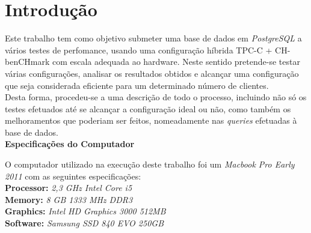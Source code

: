 \section{Introdução}

Este trabalho tem como objetivo submeter uma base de dados em \textit{PostgreSQL} a vários testes de perfomance, usando uma configuração híbrida TPC-C + CH-benCHmark com escala adequada ao hardware. Neste sentido pretende-se testar várias configurações, analisar os resultados obtidos e alcançar uma configuração que seja considerada eficiente para um determinado número de clientes.\\

Desta forma, procedeu-se a uma descrição de todo o processo, incluindo não só os testes efetuados até se alcançar a configuração ideal ou não, como também os melhoramentos que poderiam ser feitos, nomeadamente nas \textit{queries} efetuadas à base de dados.\\


\textbf{Especificações do Computador}

O computador utilizado na execução deste trabalho foi um \textit{Macbook Pro Early 2011} com as seguintes especificações:\\

\textbf{Processor:} \textit{2,3 GHz Intel Core i5} \\

\textbf{Memory:} \textit{8 GB 1333 MHz DDR3} \\

\textbf{Graphics:} \textit{Intel HD Graphics 3000 512MB} \\

\textbf{Software:} \textit{Samsung SSD 840 EVO 250GB} \\
